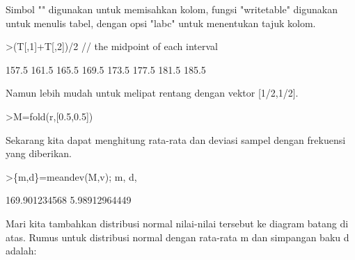 \documentclass[a4paper,10pt]{article}
\begin{document}
\begin{eulernotebook}
\begin{eulercomment}
Simbol "\textbar{}" digunakan untuk memisahkan kolom, fungsi "writetable"
digunakan untuk menulis tabel, dengan opsi "labc" untuk menentukan
tajuk kolom.
\end{eulercomment}
\begin{eulerprompt}
>(T[,1]+T[,2])/2 // the midpoint of each interval
\end{eulerprompt}
\begin{euleroutput}
          157.5 
          161.5 
          165.5 
          169.5 
          173.5 
          177.5 
          181.5 
          185.5 
\end{euleroutput}
\begin{eulercomment}
Namun lebih mudah untuk melipat rentang dengan vektor [1/2,1/2].
\end{eulercomment}
\begin{eulerprompt}
>M=fold(r,[0.5,0.5])
\end{eulerprompt}
\begin{euleroutput}
  [157.5,  161.5,  165.5,  169.5,  173.5,  177.5,  181.5,  185.5]
\end{euleroutput}
\begin{eulercomment}
Sekarang kita dapat menghitung rata-rata dan deviasi sampel dengan
frekuensi yang diberikan.
\end{eulercomment}
\begin{eulerprompt}
>\{m,d\}=meandev(M,v); m, d,
\end{eulerprompt}
\begin{euleroutput}
  169.901234568
  5.98912964449
\end{euleroutput}
\begin{eulercomment}
Mari kita tambahkan distribusi normal nilai-nilai tersebut ke diagram
batang di atas. Rumus untuk distribusi normal dengan rata-rata m dan
simpangan baku d adalah:


\end{eulercomment}
\end{eulernotebook}
\end{document}
